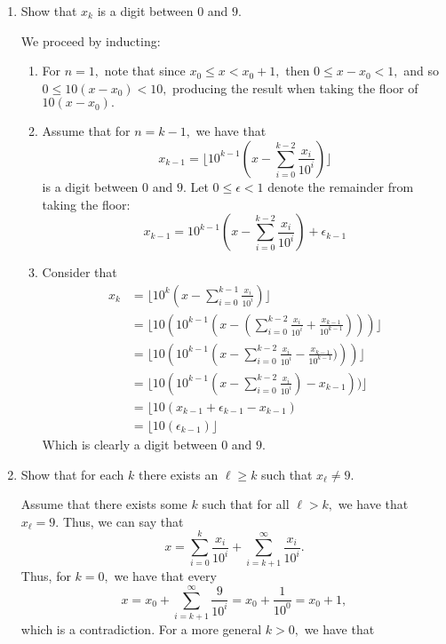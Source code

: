 \documentclass[11pt]{article}
\begin{document}
\begin{enumerate}
    \item \begin{problem}
        Show that $x_k$ is a digit between $0$ and $9.$
    \end{problem}
    \begin{solution}
        We proceed by inducting:
        \begin{enumerate}
            \item For $n=1,$ note that since $x_0 \leq x < x_0+1,$ then $0\leq x - x_0 < 1,$ and so $0\leq 10(x-x_0) < 10,$ producing the result when taking the floor of $10(x-x_0).$
            \item Assume that for $n = k-1,$ we have that 
            \[x_{k-1} = \lfloor 10^{k-1}\left(x - \sum_{i=0}^{k-2}\frac{x_i}{10^i}\right)\rfloor\] is a digit between $0$ and $9.$ Let $0\leq \epsilon<1$ denote the remainder from taking the floor:
            \[x_{k-1} = 10^{k-1}\left(x - \sum_{i=0}^{k-2}\frac{x_i}{10^i}\right)+\epsilon_{k-1}\]
            \item Consider that
            \begin{align*}
                x_k &= \lfloor 10^{k}\left(x - \sum_{i=0}^{k-1}\frac{x_i}{10^i}\right)\rfloor\\
                &= \lfloor10(10^{k-1}\left(x - (\sum_{i=0}^{k-2}\frac{x_i}{10^i} + \frac{x_{k-1}}{10^{k-1}})\right))\rfloor\\
                &= \lfloor10(10^{k-1}\left(x - \sum_{i=0}^{k-2}\frac{x_i}{10^i} - \frac{x_{k-1}}{10^{k-1}})\right))\rfloor\\
                &= \lfloor10(10^{k-1}\left(x - \sum_{i=0}^{k-2}\frac{x_i}{10^i}\right) - x_{k-1}))\rfloor\\
                &= \lfloor10(x_{k-1} +\epsilon_{k-1} - x_{k-1})\\
                &= \lfloor10(\epsilon_{k-1})\rfloor
            \end{align*}
            Which is clearly a digit between $0$ and $9.$
        \end{enumerate}
    \end{solution}
    \item 
    \begin{problem}
        Show that for each $k$ there exists an $\ell\geq k$ such that $x_\ell \neq 9.$
    \end{problem}
    \begin{solution}
    Assume that there exists some $k$ such that for all $\ell >k,$ we have that $x_\ell = 9.$ Thus, we can say that \[x = \sum_{i=0}^k\frac{x_i}{10^i} + \sum_{i = k+1}^\infty \frac{x_i}{10^i}.\] Thus, for $k = 0,$ we have that every \[x = x_0 + \sum_{i = k+1}^\infty \frac{9}{10^i} = x_0 + \frac{1}{10^{0}} = x_0 +1,\] which is a contradiction. For a more general $k>0,$ we have that 

\end{solution}
\end{enumerate}
\end{document}
